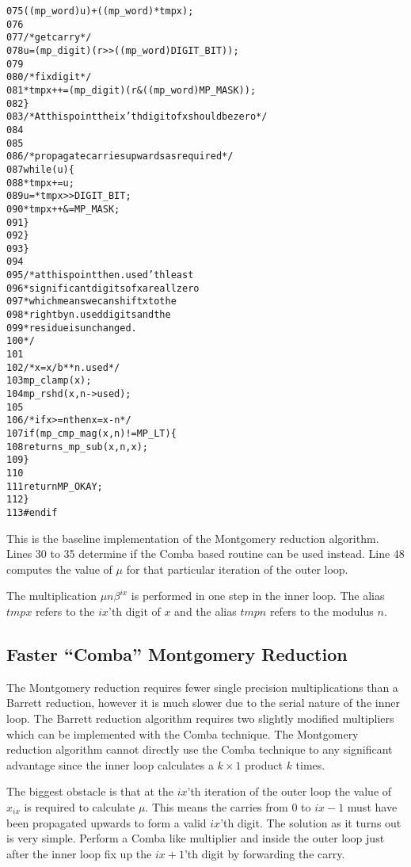 \documentclass[b5paper]{book}
\begin{document}
\begin{small}
\begin{alltt}
075                     ((mp_word) u) + ((mp_word) * tmpx);
076   
077           /* get carry */
078           u       = (mp_digit)(r >> ((mp_word) DIGIT_BIT));
079   
080           /* fix digit */
081           *tmpx++ = (mp_digit)(r & ((mp_word) MP_MASK));
082         \}
083         /* At this point the ix'th digit of x should be zero */
084   
085   
086         /* propagate carries upwards as required*/
087         while (u) \{
088           *tmpx   += u;
089           u        = *tmpx >> DIGIT_BIT;
090           *tmpx++ &= MP_MASK;
091         \}
092       \}
093     \}
094   
095     /* at this point the n.used'th least
096      * significant digits of x are all zero
097      * which means we can shift x to the
098      * right by n.used digits and the
099      * residue is unchanged.
100      */
101   
102     /* x = x/b**n.used */
103     mp_clamp(x);
104     mp_rshd (x, n->used);
105   
106     /* if x >= n then x = x - n */
107     if (mp_cmp_mag (x, n) != MP_LT) \{
108       return s_mp_sub (x, n, x);
109     \}
110   
111     return MP_OKAY;
112   \}
113   #endif
\end{alltt}
\end{small}

This is the baseline implementation of the Montgomery reduction algorithm.  Lines 30 to 35 determine if the Comba based
routine can be used instead.  Line 48 computes the value of $\mu$ for that particular iteration of the outer loop.  

The multiplication $\mu n \beta^{ix}$ is performed in one step in the inner loop.  The alias $tmpx$ refers to the $ix$'th digit of $x$ and
the alias $tmpn$ refers to the modulus $n$.  

\subsection{Faster ``Comba'' Montgomery Reduction}

The Montgomery reduction requires fewer single precision multiplications than a Barrett reduction, however it is much slower due to the serial
nature of the inner loop.  The Barrett reduction algorithm requires two slightly modified multipliers which can be implemented with the Comba
technique.  The Montgomery reduction algorithm cannot directly use the Comba technique to any significant advantage since the inner loop calculates
a $k \times 1$ product $k$ times. 

The biggest obstacle is that at the $ix$'th iteration of the outer loop the value of $x_{ix}$ is required to calculate $\mu$.  This means the 
carries from $0$ to $ix - 1$ must have been propagated upwards to form a valid $ix$'th digit.  The solution as it turns out is very simple.  
Perform a Comba like multiplier and inside the outer loop just after the inner loop fix up the $ix + 1$'th digit by forwarding the carry.  
\end{document}
